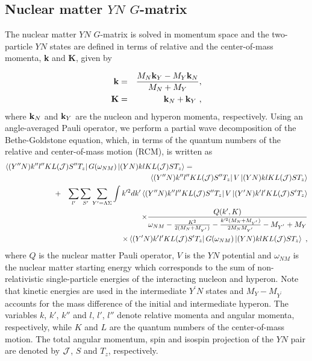 \subsection{Nuclear matter $YN$ $G$-matrix}

The nuclear matter $YN$ $G$-matrix is solved in momentum space and the 
two-particle $YN$ states are defined in terms of 
relative and the center-of-mass
momenta, {\bf k} and {\bf K}, given by

\begin{eqnarray}
 {\bf k} &=&\frac{M_N{\bf k}_Y-M_Y{\bf k}_N}{M_N+M_Y}, \nonumber \\   
  {\bf K} &=&{\bf k}_N+{\bf k}_Y \ , \nonumber   
\end{eqnarray}
where ${\bf k}_N$ and ${\bf k}_Y$ are the nucleon and hyperon momenta,
respectively.
Using an angle-averaged Pauli operator, we perform a partial wave
decomposition of the Bethe-Goldstone equation, which, in terms of the 
quantum numbers of the relative and center-of-mass motion (RCM), is 
written as
\begin{eqnarray}
\lefteqn{\left\langle (Y''N)k''l''KL({\cal J})S''T_z\right |
      G(\omega_{NM})\left | (YN)klKL({\cal J})ST_z \right\rangle
      =} \hspace{2cm}\nonumber\\
  && \left\langle (Y''N)k''l''KL({\cal J})S'' T_z\right |
      V\left | (YN)klKL({\cal J})ST_z \right\rangle
      \nonumber \\
      &\quad +& {\displaystyle
      \sum_{l'}\sum_{S'}\sum_{Y'=\Lambda\Sigma}\int k'^{2}dk'}
      \left\langle (Y''N)k''l''KL({\cal J})S''T_z\right |
      V\left | (Y'N)k'l'KL({\cal J})S'T_z \right\rangle \nonumber \\
      && \times \frac{Q(k',K)}{\omega_{NM} -\frac{K^2}{2(M_N+M_{Y^{'}})} -
      \frac{k'^2(M_N+M_{Y^{'}})}{2M_NM_{Y^{'}}}-M_{Y^{'}}+M_Y}
\nonumber \\
      && \times\left\langle (Y'N)k'l'KL({\cal J})S'T_z\right |
      G(\omega_{NM})\left | (YN)klKL({\cal J})ST_z
\right\rangle \ ,
   \label{eq:gmat}
\end{eqnarray}
where $Q$ is the nuclear matter Pauli operator, $V$ is the $YN$ potential
and $\omega_{NM}$
is the nuclear matter starting energy which corresponds to the sum of 
non-relativistic single-particle energies of the interacting nucleon and 
hyperon. 
Note that kinetic energies are used in the intermediate $Y^\prime N$ states
and $M_{Y}-M_{Y^\prime}$ accounts for the mass difference of the initial 
and intermediate hyperon.
The
variables $k$, $k'$, $k''$ and $l$, $l'$, $l''$ denote relative momenta
and angular momenta, respectively, while $K$ and $L$ 
are the quantum numbers of the center-of-mass motion. 
The total angular momentum,  spin and isospin
projection of the $YN$ pair are denoted by ${\cal J}$, $S$ and
$T_z$, respectively.    



